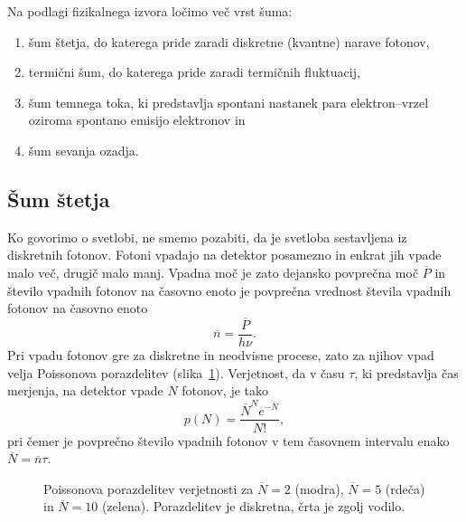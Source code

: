Na podlagi fizikalnega izvora ločimo več vrst šuma:
\begin{enumerate}
\item šum štetja, do katerega pride zaradi diskretne (kvantne) narave fotonov,
\item termični šum, do katerega pride zaradi termičnih fluktuacij,
\item šum temnega toka, ki predstavlja spontani nastanek para elektron--vrzel oziroma spontano
emisijo elektronov in
\item šum sevanja ozadja.
\end{enumerate}

\subsection*{Šum štetja} 
Ko govorimo o svetlobi, ne smemo pozabiti, da je svetloba sestavljena iz diskretnih fotonov. 
Fotoni vpadajo na detektor posamezno in enkrat jih vpade malo več, 
drugič malo manj. Vpadna moč je zato dejansko povprečna moč $\overline{P}$ in število 
vpadnih fotonov na časovno enoto je povprečna vrednost števila vpadnih fotonov na časovno enoto
\begin{equation}
\overline{n} = \frac{\overline{P}}{h\nu}.
\end{equation}
Pri vpadu fotonov gre za diskretne in neodvisne procese, zato za njihov vpad velja
Poissonova porazdelitev (slika~\ref{11_Poiss}). Verjetnost, da v času $\tau$, ki predstavlja 
čas merjenja, na detektor vpade $N$ fotonov, je tako 
\begin{equation}
p(N) = \frac{\overline{N}^N e^{-\overline{N}}}{N!},
\label{Poisson}
\end{equation}
pri čemer je povprečno število vpadnih fotonov v tem časovnem intervalu 
enako $\overline{N} = \overline{n}\tau$.
\begin{figure}[h]
\centering
\def\svgwidth{90truemm} 

\caption{Poissonova porazdelitev verjetnosti za $\overline{N}=2$ (modra), 
$\overline{N}=5$ (rdeča) in $\overline{N}=10$ (zelena). Porazdelitev je 
diskretna, črta je zgolj vodilo.}
\label{11_Poiss}
\end{figure}

